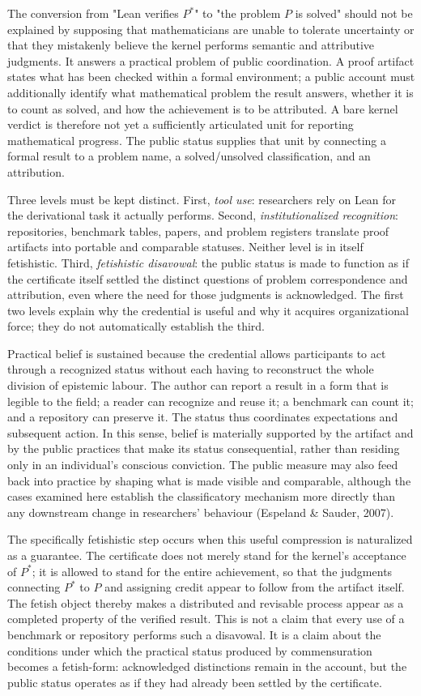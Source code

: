 \documentclass[pdflatex,sn-apa]{sn-jnl}
\begin{document}
The conversion from "Lean verifies \(P^*\)" to "the problem \(P\) is solved" should not be explained by supposing that mathematicians are unable to tolerate uncertainty or that they mistakenly believe the kernel performs semantic and attributive judgments. It answers a practical problem of public coordination. A proof artifact states what has been checked within a formal environment; a public account must additionally identify what mathematical problem the result answers, whether it is to count as solved, and how the achievement is to be attributed. A bare kernel verdict is therefore not yet a sufficiently articulated unit for reporting mathematical progress. The public status supplies that unit by connecting a formal result to a problem name, a solved/unsolved classification, and an attribution.

Three levels must be kept distinct. First, \emph{tool use}: researchers rely on Lean for the derivational task it actually performs. Second, \emph{institutionalized recognition}: repositories, benchmark tables, papers, and problem registers translate proof artifacts into portable and comparable statuses. Neither level is in itself fetishistic. Third, \emph{fetishistic disavowal}: the public status is made to function as if the certificate itself settled the distinct questions of problem correspondence and attribution, even where the need for those judgments is acknowledged. The first two levels explain why the credential is useful and why it acquires organizational force; they do not automatically establish the third.

Practical belief is sustained because the credential allows participants to act through a recognized status without each having to reconstruct the whole division of epistemic labour. The author can report a result in a form that is legible to the field; a reader can recognize and reuse it; a benchmark can count it; and a repository can preserve it. The status thus coordinates expectations and subsequent action. In this sense, belief is materially supported by the artifact and by the public practices that make its status consequential, rather than residing only in an individual's conscious conviction. The public measure may also feed back into practice by shaping what is made visible and comparable, although the cases examined here establish the classificatory mechanism more directly than any downstream change in researchers' behaviour (Espeland \& Sauder, 2007).

The specifically fetishistic step occurs when this useful compression is naturalized as a guarantee. The certificate does not merely stand for the kernel's acceptance of \(P^*\); it is allowed to stand for the entire achievement, so that the judgments connecting \(P^*\) to \(P\) and assigning credit appear to follow from the artifact itself. The fetish object thereby makes a distributed and revisable process appear as a completed property of the verified result. This is not a claim that every use of a benchmark or repository performs such a disavowal. It is a claim about the conditions under which the practical status produced by commensuration becomes a fetish-form: acknowledged distinctions remain in the account, but the public status operates as if they had already been settled by the certificate.
\end{document}
